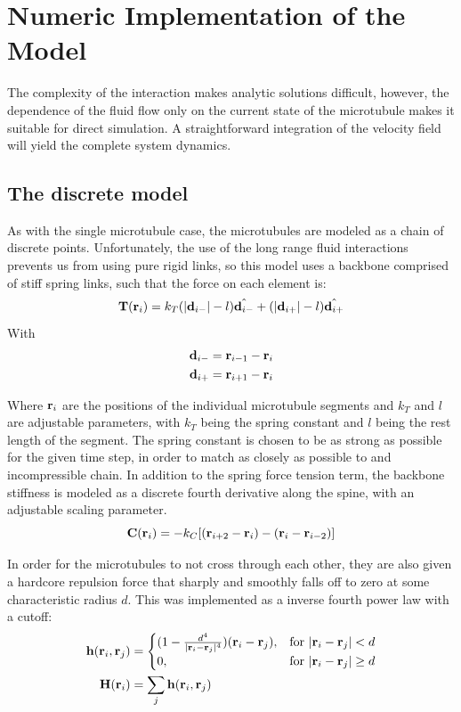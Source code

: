 \documentclass[11pt]{ucthesis}
\def\br{{\bf r}}
\begin{document}
\section{Numeric Implementation of the Model}
The complexity of the interaction makes analytic solutions difficult, however, the dependence of the fluid flow only on the current state of the microtubule makes it suitable for direct simulation. A straightforward integration of the velocity field will yield the complete system dynamics.
\subsection{The discrete model}
As with the single microtubule case, the microtubules are modeled as a chain of discrete points. Unfortunately, the use of the long range fluid interactions prevents us from using pure rigid links, so this model uses a backbone comprised of stiff spring links, such that the force on each element is:
\begin{equation}
\label{eq:discretespring}
\mathbf{T}(\br_i) = k_T ( |\mathbf{d}_{i-}| - l )\hat{\mathbf{d}_{i-}} + ( |\mathbf{d}_{i+}| - l )\hat{\mathbf{d}_{i+}}
\end{equation}
With 
\begin{eqnarray*}
\mathbf{d}_{i-} &= \br_{i-1} - \br_i \\
\mathbf{d}_{i+} &= \br_{i+1} - \br_i
\end{eqnarray*}

Where $\br_i$ are the positions of the individual microtubule segments and $k_T$ and $l$  are adjustable parameters, with $k_T$ being the spring constant and $l$ being the rest length of the segment.  The spring constant is chosen to be as strong as possible for the given time step, in order to match as closely as possible to and incompressible chain.
In addition to the spring force tension term, the backbone stiffness is modeled as a discrete fourth derivative along the spine, with an adjustable scaling parameter.
\begin{equation}
\label{eq:discretestiff}
\mathbf{C}(\br_i) =  - k_C[ (\br_{i+2} - \br_i) - (\br_i - \br_{i-2})]
\end{equation}

In order for the microtubules to not cross through each other, they are also given a hardcore repulsion force that sharply and smoothly falls off to zero at some characteristic radius $d$.
This was implemented as a inverse fourth power law with a cutoff:
\begin{align}
\label{eq:discretehardcore}
\mathbf{h}(\br_i,\br_j) &= \begin{cases}(1 - \frac{d^4}{|\br_i - \br_j|^4})(\br_i - \br_j),&  \text{for } |\br_i - \br_j| < d \\
0,& \text{for } |\br_i - \br_j| \ge d \end{cases}\\
\mathbf{H}(\br_i) &= \sum_j \mathbf{h}(\br_i,\br_j)
\end{align}
\end{document}
